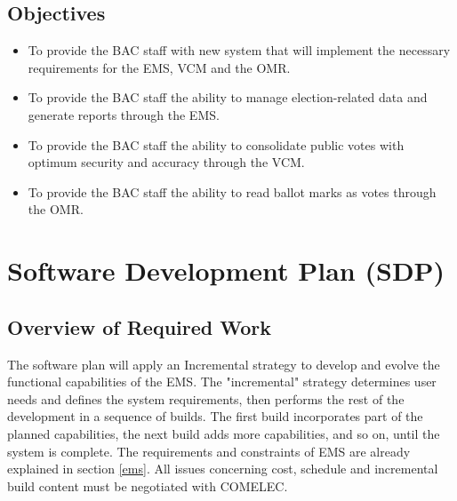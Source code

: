 \documentclass[a4paper, 11pt]{article}
\begin{document}
\subsection{Objectives}
\begin{itemize}
  \item To provide the BAC staff with new system that will implement the necessary requirements for the EMS, VCM and the OMR.
  \item To provide the BAC staff the ability to manage election-related data and generate reports through the EMS.
  \item To provide the BAC staff the ability to consolidate public votes with optimum security and accuracy through the VCM.
  \item To provide the BAC staff the ability to read ballot marks as votes through the OMR.
\end{itemize}


\section{Software Development Plan (SDP)}
\subsection{Overview of Required Work}
The software plan will apply an Incremental strategy to develop and evolve the functional capabilities of the EMS. The "incremental" strategy determines user needs and defines the system requirements, then performs the rest of the development in a sequence of builds. The first build incorporates part of the planned capabilities, the next build adds more capabilities, and so on, until the system is complete. The requirements and constraints of EMS are already explained in section \ref{ems}. All issues concerning cost, schedule and incremental build content must be negotiated with COMELEC.
\end{document}

